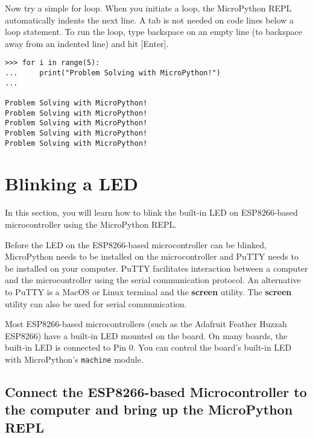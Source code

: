 \documentclass{book}
\newcommand{\passthrough}[1]{#1}
\begin{document}
Now try a simple for loop. When you initiate a loop, the MicroPython
REPL automatically indents the next line. A tab is not needed on code
lines below a loop statement. To run the loop, type backspace on an
empty line (to backspace away from an indented line) and hit
{[}Enter{]}.

\begin{lstlisting}
>>> for i in range(5):
...     print("Problem Solving with MicroPython!")
...

Problem Solving with MicroPython!
Problem Solving with MicroPython!
Problem Solving with MicroPython!
Problem Solving with MicroPython!
Problem Solving with MicroPython!
\end{lstlisting}
    




    
        \hypertarget{blinking-a-led}{%
\section{Blinking a LED}\label{blinking-a-led}}
    




    
        In this section, you will learn how to blink the built-in LED on
ESP8266-based microcontroller using the MicroPython REPL.

Before the LED on the ESP8266-based microcontroller can be blinked,
MicroPython needs to be installed on the microcontroller and PuTTY needs
to be installed on your computer. PuTTY facilitates interaction between
a computer and the microcontroller using the serial communication
protocol. An alternative to PuTTY is a MacOS or Linux terminal and the
\textbf{screen} utility. The \textbf{screen} utility can also be used
for serial communication.
    




    
        Most ESP8266-based microcontrollers (such as the Adafruit Feather Huzzah
ESP8266) have a built-in LED mounted on the board. On many boards, the
built-in LED is connected to Pin 0. You can control the board's built-in
LED with MicroPython's \passthrough{\lstinline!machine!} module.
    




    
        \hypertarget{connect-the-esp8266-based-microcontroller-to-the-computer-and-bring-up-the-micropython-repl}{%
\subsection{Connect the ESP8266-based Microcontroller to the computer
and bring up the MicroPython
REPL}\label{connect-the-esp8266-based-microcontroller-to-the-computer-and-bring-up-the-micropython-repl}}
    
\end{document}
